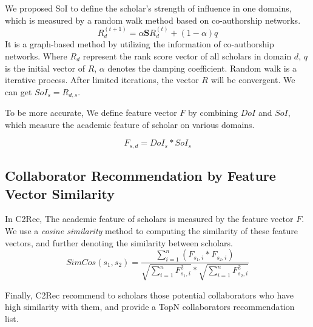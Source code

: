 \documentclass{chi-ext}
\begin{document}
We proposed SoI to define the scholar's strength of influence in one domains, which is measured by a random walk method based on co-authorship networks.
\begin{equation}
R_{d}^{(t+1)}=\alpha \mathbf{S}R_{d}^{(t)}+(1-\alpha)q
\end{equation}
It is a graph-based method by utilizing the information of co-authorship networks. Where $R_{d}$ represent the rank score vector of all scholars in domain $d$, $q$ is the initial vector of $R$, $\alpha$ denotes the damping coefficient. Random walk is a iterative process. After limited iterations, the vector $R$ will be convergent. We can get $SoI_{s}=R_{d,s}$.

To be more accurate, We define feature vector $F$ by combining $DoI$ and $SoI$, which measure the academic feature of scholar on various domains.

\begin{equation}
F_{s,d}=DoI_{s}*SoI_{s}
\end{equation}

\subsection{Collaborator Recommendation by Feature Vector Similarity}
In C2Rec, The academic feature of scholars is measured by the feature vector $F$. We use a \emph{cosine similarity} method to computing the similarity of these feature vectors, and further denoting the similarity between scholars.
\begin{equation}
SimCos(s_{1},s_{2})=\frac{\sum_{i=1}^{n}(F_{s_{1},i}*F_{s_{2},i})}{\sqrt{\sum_{i=1}^{n}F_{s_{1},i}^2}*\sqrt{\sum_{i=1}^{n}F_{s_{2},i}^2}}
\end{equation}

Finally, C2Rec recommend to scholars those potential collaborators who have high similarity with them, and provide a TopN collaborators recommendation list. 
\end{document}
